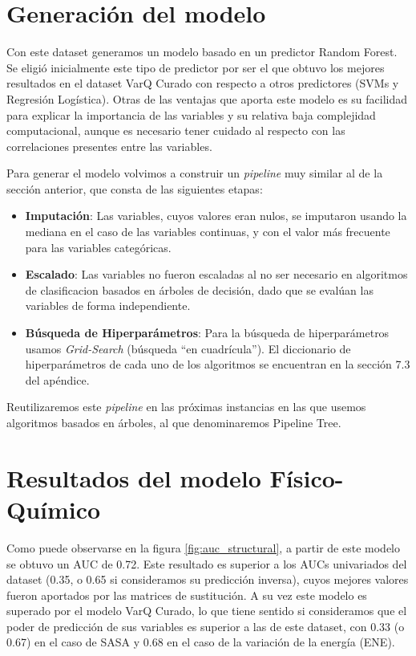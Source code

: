 

\section{Generación del modelo}

Con este dataset generamos un modelo basado en un predictor Random Forest. 
Se eligió inicialmente este tipo de predictor por ser el que obtuvo los mejores resultados en el dataset VarQ Curado con respecto a otros predictores (SVMs y Regresión Logística). Otras de las ventajas que aporta este modelo es su facilidad para explicar la importancia de las variables y su relativa baja complejidad computacional, aunque es necesario tener cuidado al respecto con las correlaciones presentes entre las variables.

Para generar el modelo volvimos a construir un \textit{pipeline} muy similar al de la sección anterior, que consta de las siguientes etapas:

\begin{itemize}
 
\item \textbf{Imputación}: Las variables, cuyos valores eran nulos, se imputaron usando la mediana en el caso de las variables continuas, y con el valor más frecuente para las variables categóricas. 
\item \textbf{Escalado}: Las variables no fueron escaladas al no ser necesario en algoritmos de clasificacion basados en árboles de decisión, dado que se evalúan las variables de forma independiente. 
\item \textbf{Búsqueda de Hiperparámetros}: Para la búsqueda de hiperparámetros usamos \textit{Grid-Search} (búsqueda ``en cuadrícula''). El diccionario de hiperparámetros de cada uno de los algoritmos se encuentran en la sección 7.3 del apéndice.
\end{itemize}

Reutilizaremos este \textit{pipeline} en las próximas instancias en las que usemos algoritmos basados en árboles, al que denominaremos Pipeline Tree. 

\section{Resultados del modelo Físico-Químico}

Como puede observarse en la figura \ref{fig:auc_structural}, a partir de este modelo se obtuvo un AUC de 0.72. Este resultado es superior a los AUCs univariados del dataset (0.35, o 0.65 si consideramos su predicción inversa), cuyos mejores valores fueron aportados por las matrices de sustitución. A su vez este modelo es superado por el modelo VarQ Curado, lo que tiene sentido si consideramos que el poder de predicción de sus variables es superior a las de este  dataset, con 0.33 (o 0.67) en el caso de SASA y 0.68 en el caso de la variación de la energía (ENE).

